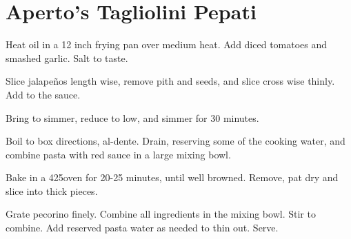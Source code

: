 \section{Aperto's Tagliolini Pepati}
\begin{recipe}



Heat oil in a 12 inch frying pan over medium heat. Add diced tomatoes and
smashed garlic. Salt to taste.

Slice jalapeños length wise, remove pith and seeds, and slice cross wise thinly.
Add to the sauce.

Bring to simmer, reduce to low, and simmer for 30 minutes.


Boil to box directions, al-dente. Drain, reserving some of the cooking water,
and combine pasta with red sauce in a large mixing bowl.


Bake in a 425\degree oven for 20-25 minutes, until well browned. Remove, pat
dry and slice into thick pieces.


Grate pecorino finely. Combine all ingredients in the mixing bowl.
Stir to combine. Add reserved pasta water as needed to thin out. Serve.

\end{recipe}
